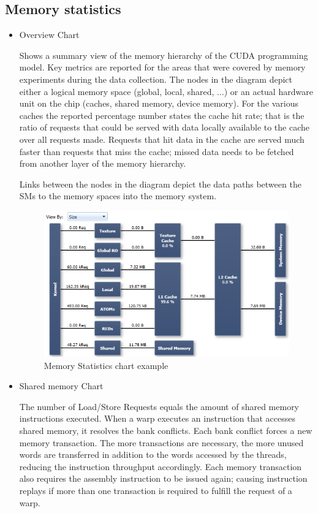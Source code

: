 \documentclass[oneside,openright,12pt,final,en]{mgr}
\begin{document}
\subsection{Memory statistics}

\begin{itemize}
	\item Overview Chart
	
	Shows a summary view of the memory hierarchy of the CUDA programming model. Key metrics are reported for the areas that were covered by memory experiments during the data collection. The nodes in the diagram depict either a logical memory space (global, local, shared, ...) or an actual hardware unit on the chip (caches, shared memory, device memory). For the various caches the reported percentage number states the cache hit rate; that is the ratio of requests that could be served with data locally available to the cache over all requests made. Requests that hit data in the cache are served much faster than requests that miss the cache; missed data needs to be fetched from another layer of the memory hierarchy.
	
	Links between the nodes in the diagram depict the data paths between the SMs to the memory spaces into the memory system.
	
	\begin{figure}[H]
		\centering
		\includegraphics{MemoryStatisticsChart}
		\caption{Memory Statistics chart example}
	\end{figure}

	\item Shared memory Chart
	
	The number of Load/Store Requests equals the amount of shared memory instructions executed. When a warp executes an instruction that accesses shared memory, it resolves the bank conflicts. Each bank conflict forces a new memory transaction. The more transactions are necessary, the more unused words are transferred in addition to the words accessed by the threads, reducing the instruction throughput accordingly. Each memory transaction also requires the assembly instruction to be issued again; causing instruction replays if more than one transaction is required to fulfill the request of a warp.
	

\end{itemize}
\end{document}
